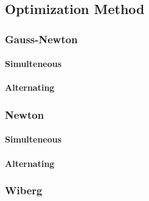 \subsection{Optimization Method}
\label{sec:algorithms}

\subsubsection{Gauss-Newton}
\label{sec:gn}

\paragraph{Simulteneous}
\label{sec:gn_sim}

\paragraph{Alternating}
\label{sec:gn_alt}

\subsubsection{Newton}
\label{sec:n}

\paragraph{Simulteneous}
\label{sec:n_sim}

\paragraph{Alternating}
\label{sec:n_alt}

\subsubsection{Wiberg}
\label{sec:wiberg}

